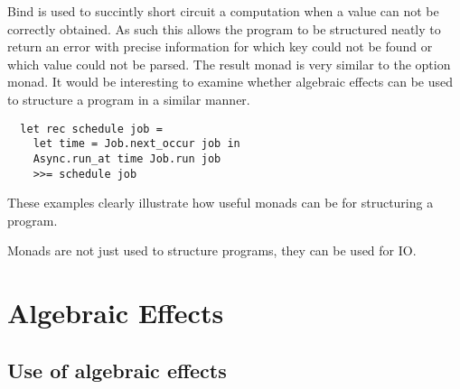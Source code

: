 \documentclass[a4paper,10pt]{article}
\begin{document}
Bind is used to succintly short circuit a computation when a value can not be
correctly obtained. As such this allows the program to be structured neatly to return
an error with precise information for which key could not be found or which value could
not be parsed. The result monad is very similar to the option monad. It would be interesting
to examine whether algebraic effects can be used to structure a program in a similar manner.

\begin{verbatim}
  let rec schedule job =
    let time = Job.next_occur job in
    Async.run_at time Job.run job
    >>= schedule job
\end{verbatim}

These examples clearly illustrate how useful monads can be for structuring a program.

Monads are not just used to structure programs, they can be used for IO.

\section{Algebraic Effects}
\subsection{Use of algebraic effects}

\medskip



\end{document}
